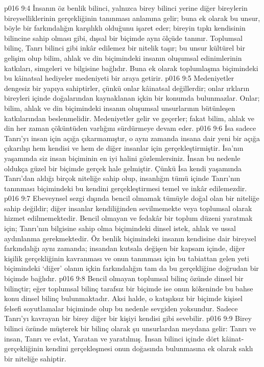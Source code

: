 \vs p016 9:4 İnsanın öz benlik bilinci, yalnızca birey bilinci yerine diğer bireylerin bireyselliklerinin gerçekliğinin tanınması anlamına gelir; buna ek olarak bu unsur, böyle bir farkındalığın karşılıklı olduğunu işaret eder; bireyin tıpkı kendisinin bilincine sahip olması gibi, dışsal bir biçimde aynı ölçüde tanınır. Toplumsal bilinç, Tanrı bilinci gibi inkâr edilemez bir nitelik taşır; bu unsur kültürel bir gelişim olup bilim, ahlak ve din biçimindeki insanın oluşumsal edinimlerinin katkıları, simgeleri ve bilgisine bağlıdır. Buna ek olarak toplumlaşma biçimindeki bu kâinatsal hediyeler medeniyeti bir araya getirir.
\vs p016 9:5 Medeniyetler dengesiz bir yapıya sahiptirler, çünkü onlar kâinatsal değillerdir; onlar ırkların bireyleri içinde doğalarından kaynaklanan içkin bir konumda bulunmazlar. Onlar; bilim, ahlak ve din biçimindeki insanın oluşumsal unsurlarının bütünleşen katkılarından beslenmelidir. Medeniyetler gelir ve geçerler; fakat bilim, ahlak ve din her zaman çöküntüden varlığını sürdürmeye devam eder.
\vs p016 9:6 İsa sadece Tanrı’yı insan için açığa çıkarmamıştır, o aynı zamanda insana dair yeni bir açığa çıkarılışı hem kendisi ve hem de diğer insanlar için gerçekleştirmiştir. İsa’nın yaşamında siz insan biçiminin en iyi halini gözlemlersiniz. İnsan bu nedenle oldukça güzel bir biçimde gerçek hale gelmiştir. Çünkü İsa kendi yaşamında Tanrı’dan aldığı birçok niteliğe sahip olup, insanlığın tümü içinde Tanrı’nın tanınması biçimindeki bu kendini gerçekleştirmesi temel ve inkâr edilemezdir.
\vs p016 9:7 Ebeveynsel sezgi dışında bencil olmamak tümüyle doğal olan bir niteliğe sahip değildir; diğer insanlar kendiliğinden sevilmemekte veya toplumsal olarak hizmet edilmemektedir. Bencil olmayan ve fedakâr bir toplum düzeni yaratmak için; Tanrı’nın bilgisine sahip olma biçimindeki dinsel istek, ahlak ve ussal aydınlanma gerekmektedir. Öz benlik biçimindeki insanın kendisine dair bireysel farkındalığı aynı zamanda; insandan kutsala değişen bir kapsam içinde, diğer kişilik gerçekliğinin kavranması ve onun tanınması için bu tabiattan gelen yeti biçimindeki ‘diğer’ olanın içkin farkındalığın tam da bu gerçekliğine doğrudan bir biçimde bağlıdır.
\vs p016 9:8 Bencil olmayan toplumsal bilinç özünde dinsel bir bilinçtir; eğer toplumsal bilinç tarafsız bir biçimde ise onun kökeninde bu bahse konu dinsel bilinç bulunmaktadır. Aksi halde, o katışıksız bir biçimde kişisel felsefi soyutlamalar biçiminde olup bu nedenle sevgiden yoksundur. Sadece Tanrı’yı kavrayan bir birey diğer bir kişiyi kendisi gibi sevebilir.
\vs p016 9:9 Birey bilinci özünde müşterek bir bilinç olarak şu unsurlardan meydana gelir: Tanrı ve insan, Tanrı ve evlat, Yaratan ve yaratılmış. İnsan bilinci içinde dört kâinat\hyp{}gerçekliğinin kendini gerçekleşmesi onun doğasında bulunmasına ek olarak saklı bir niteliğe sahiptir.
